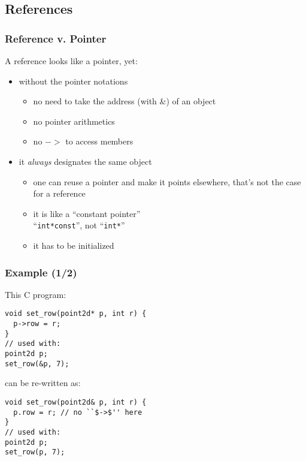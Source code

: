 \documentclass{beamer}
\newcommand{\code}[1]{{\scriptsize{\texttt{#1}}}\xspace}
\begin{document}
\subsection{References}


\begin{frame}
  \frametitle{Reference v. Pointer}

  A reference looks like a pointer, yet:
  \begin{itemize}
  \item without the pointer notations
    \begin{itemize}
    \item no need to take the address (with \&) of an object
    \item no pointer arithmetics
    \item no $->$ to access members
    \end{itemize}
  \item it \emph{always} designates the same object
    \begin{itemize}
    \item one can reuse a pointer and make it points elsewhere, that's
      not the case for a reference
    \item it is like a ``constant pointer''\\
      ``\code{int*const}'', not ``\code{int*}''
    \item it has to be initialized
    \end{itemize}
  \end{itemize}

\end{frame}


\begin{frame}[fragile]
  \frametitle{Example (1/2)}

This C program:

\begin{lstlisting}
void set_row(point2d* p, int r) {
  p->row = r;
}
// used with:
point2d p;
set_row(&p, 7);
\end{lstlisting}

\smallskip

can be re-written as:
\begin{lstlisting}
void set_row(point2d& p, int r) {
  p.row = r; // no ``$->$'' here
}
// used with:
point2d p;
set_row(p, 7);
\end{lstlisting}

\end{frame}
\end{document}
